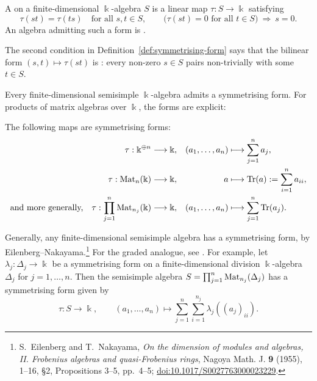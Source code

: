 \begin{advanced}[suppressfirstparskip=true,innertopmargin=0pt]
\begin{definition}\label{def:symmetrising-form}
A  on a finite-dimensional $\Bbbk$-algebra $S$ is a linear map $\tau:S\to\Bbbk$ satisfying
\[
\tau(st)=\tau(ts)\quad\text{for all }s,t\in S,
\qquad
\bigl(\tau(st)=0\text{ for all }t\in S\bigr)\ \Longrightarrow\ s=0.
\]
An algebra admitting such a form is .
\end{definition}

The second condition in Definition~\ref{def:symmetrising-form} says that the bilinear form $(s,t)\mapsto\tau(st)$ is : every non-zero $s\in S$ pairs non-trivially with some $t\in S$.

Every finite-dimensional semisimple $\Bbbk$-algebra admits a symmetrising form.
For products of matrix algebras over $\Bbbk$, the forms are explicit:

\begin{example}\label{ex:symmetrising-form}
The following maps are symmetrising forms:
\[
\begin{aligned}
\tau:\Bbbk^{\oplus n}&\longrightarrow\Bbbk,
& (a_1,\ldots,a_n)&\longmapsto\sum_{j=1}^n a_j,\\
\tau:\operatorname{Mat}\nolimits_n(\Bbbk)&\longrightarrow\Bbbk,
& a&\longmapsto\operatorname{Tr}\nolimits(a):=\sum_{i=1}^n a_{ii},\\
\text{and more generally,}\quad \tau:\prod_{j=1}^n\operatorname{Mat}\nolimits_{n_j}(\Bbbk)&\longrightarrow\Bbbk,
& (a_1,\ldots,a_n)&\longmapsto\sum_{j=1}^n\operatorname{Tr}\nolimits(a_j).
\end{aligned}
\]
\end{example}

Generally, any finite-dimensional semisimple algebra has a symmetrising form, by Eilenberg--Nakayama.\footnote{S.~Eilenberg and T.~Nakayama, \emph{On the dimension of modules and algebras, II. Frobenius algebras and quasi-Frobenius rings}, Nagoya Math. J. \textbf{9} (1955), 1--16, \S2, Propositions 3--5, pp.~4--5; \href{https://doi.org/10.1017/S0027763000023229}{doi:10.1017/S0027763000023229}.}
For the graded analogue, see \cite{DNN17}.
For example, let $\lambda_j:\Delta_j\to\Bbbk$ be a symmetrising form on a finite-dimensional division $\Bbbk$-algebra $\Delta_j$ for $j=1,\ldots,n$.
Then the semisimple algebra $S=\prod_{j=1}^n\operatorname{Mat}\nolimits_{n_j}(\Delta_j)$ has a symmetrising form given by
\[
\tau:S\longrightarrow\Bbbk,\qquad
(a_1,\ldots,a_n)\longmapsto
\sum_{j=1}^n\sum_{i=1}^{n_j}\lambda_j((a_j)_{ii}).
\]


\end{advanced}
